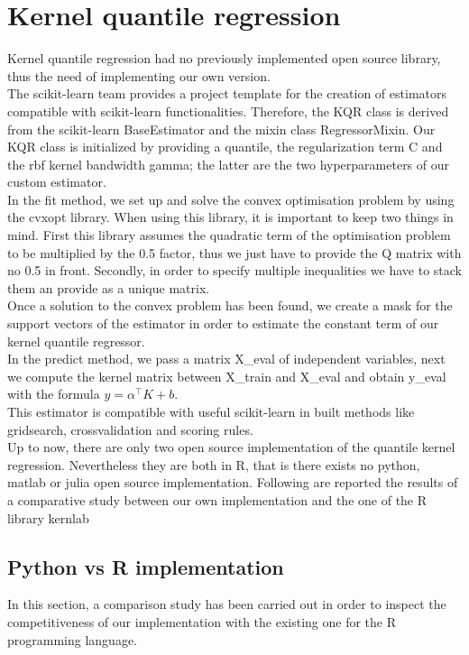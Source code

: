 \section{Kernel quantile regression}
Kernel quantile regression had no previously implemented open source library, thus the need of implementing our own version.
\\
The scikit-learn team provides a project template for the creation of estimators compatible with scikit-learn functionalities. Therefore, the KQR class is derived from the scikit-learn BaseEstimator and the mixin class RegressorMixin.
Our KQR class is initialized by providing a quantile, the regularization term C and the rbf kernel bandwidth gamma; the latter are the two hyperparameters of our custom estimator.
\\
In the fit method, we set up and solve the convex optimisation problem by using the cvxopt library. 
When using this library, it is important to keep two things in mind. First this library assumes the quadratic term of the optimisation problem to be multiplied by the 0.5 factor, thus we just have to provide the Q matrix with no 0.5 in front.
Secondly, in order to specify multiple inequalities we have to stack them an provide as a unique matrix.
\\
Once a solution to the convex problem has been found, we create a mask for the support vectors of the estimator in order to estimate the constant term of our kernel quantile regressor.
\\
In the predict method, we pass a matrix X\_eval of independent variables, next we compute the kernel matrix between X\_train and X\_eval and obtain y\_eval with the formula $y=\alpha^\intercal K+b$.
\\
This estimator is compatible with useful scikit-learn in built methods like gridsearch, crossvalidation and scoring rules.
\\
Up to now, there are only two open source implementation of the quantile kernel regression. Nevertheless they are both in R, that is there exists no python, matlab or julia open source implementation. Following are reported the results of a comparative study between our own implementation and the one of the R library kernlab
\subsection{Python vs R implementation}
In this section, a comparison study has been carried out in order to inspect the competitiveness of our implementation with the existing one for the R programming language.